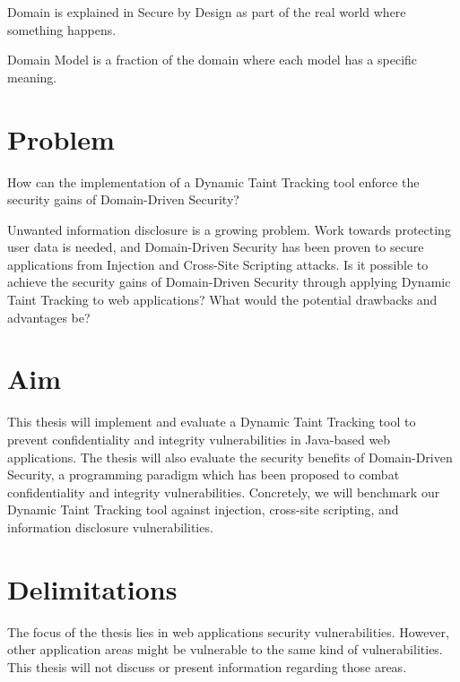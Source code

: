 \begin{definition}{Domain}
    is explained in Secure by Design \parencite{sbd2018} as part of the real world where something happens.
    \\
\end{definition}

\begin{definition}{Domain Model}
    is a fraction of the domain where each model has a specific meaning.
    \\
\end{definition}


\section{Problem}
\label{Problem}
\begin{chapquote}{}
    How can the implementation of a Dynamic Taint Tracking tool enforce the security gains of Domain-Driven Security?
\end{chapquote}

\noindent
Unwanted information disclosure is a growing problem. Work towards protecting user data is needed, and Domain-Driven Security has been proven to secure applications from Injection and Cross-Site Scripting attacks. Is it possible to achieve the security gains of Domain-Driven Security through applying Dynamic Taint Tracking to web applications? What would the potential drawbacks and advantages be?


\section{Aim}
\label{Aim}
This thesis will implement and evaluate a Dynamic Taint Tracking tool to prevent confidentiality and integrity vulnerabilities in Java-based web applications. The thesis will also evaluate the security benefits of Domain-Driven Security, a programming paradigm which has been proposed to combat confidentiality and integrity vulnerabilities. Concretely, we will benchmark our Dynamic Taint Tracking tool against injection, cross-site scripting, and information disclosure vulnerabilities.



\section{Delimitations}
\label{Delimitations}
The focus of the thesis lies in web applications security vulnerabilities. However, other application areas might be vulnerable to the same kind of vulnerabilities.  This thesis will not discuss or present information regarding those areas.

